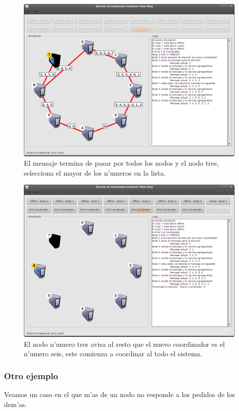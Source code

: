 \begin{figure}[h!]
\centering
 \includegraphics[scale=0.33,keepaspectratio=true]{./imagenes/tokenRing/token5.png}
 \caption{El mensaje termina de pasar por todos los nodos y el nodo tres, selecciona el mayor de los n'umeros en la lista.}
\end{figure}
\newpage

\begin{figure}[h!]
\centering
 \includegraphics[scale=0.33,keepaspectratio=true]{./imagenes/tokenRing/token6.png}
 \caption{El nodo n'umero tres avisa al resto que el nuevo coordinador es el n'umero seis, este comienza a coordinar al todo el sistema.}
\end{figure}

\subsubsection*{Otro ejemplo}
Veamos un caso en el que m'as de un nodo no responde a los pedidos de los dem'as.

